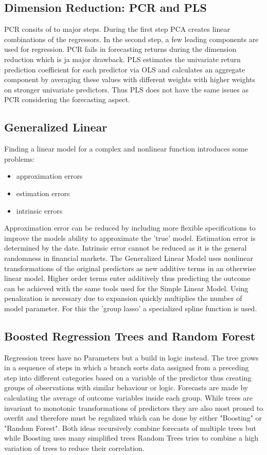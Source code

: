 \documentclass{article}
\begin{document}
\subsection{Dimension Reduction: PCR and PLS}
	PCR consits of to major steps. During the first step PCA creates linear combinations
	of the regressors. In the second step, a few leading components are used for regression.
	PCR fails in forecasting returns during the dimension reduction which is ja major drawback.
	PLS estimates the univariate return prediction coefficient for each predictor via OLS
	and calculates an aggregate component by averaging these values with different weights
	with higher weights on stronger univariate predictors. Thus PLS does not have the
	same issues as PCR considering the forecasting aspect.

\subsection{Generalized Linear}
	Finding a linear model for a complex and nonlinear function introduces some problems:
	\begin{itemize}
		\item approximation errors
		\item estimation errors
		\item intrinsic errors
	\end{itemize}
	Approximation error can be reduced by including more flexible specifications to improve the 
	models ability to approximate the 'true' model.
	Estimation error is determined by the date.
	Intrinsic error cannot be reduced as it is the general randomness in financial markets.
	The Generalized Linear Model uses nonlinear transformations of the original predictors as new
	additive terms in an otherwise linear model.
	Higher order terms enter additively thus predicting the outcome can be achieved with the same
	tools used for the Simple Linear Model.
	Using penalization is necessary due to expansion quickly multiplies the number of model parameter.
	For this the 'group lasso' a specialized spline function is used.
	
\subsection{Boosted Regression Trees and Random Forest}
	Regression trees have no Parameters but a build in logic instead.
	The tree grows in a sequence of steps in which a branch sorts data assigned from
	a preceding step into different categories based on a variable of the predictor
	thus creating groups of observations with similar behaviour or logic.
	Forecasts are made by calculating the average of outcome variables inside each group.
	While trees are invariant to monotonic transformations of predictors they are
	also most proned to overfit and therefore must be regulized which can be done
	by either "Boosting" or "Random Forest". Both ideas recursively combine
	forecasts of multiple trees but while Boosting uses many simplified trees
	Random Trees tries to combine a high variation of trees to reduce their correlation.
\end{document}
